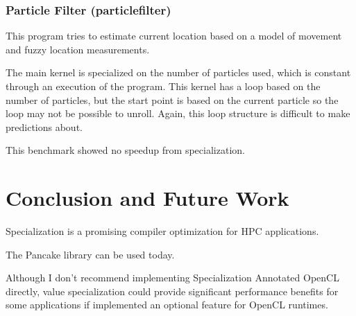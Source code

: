 \documentclass{acm_proc_article-sp}
\begin{document}
\subsubsection{Particle Filter (particlefilter)}

This program tries to estimate current location based on a model of movement
and fuzzy location measurements. 

The main kernel is specialized on the number of particles used, which is
constant through an execution of the program. This kernel has a loop based on
the number of particles, but the start point is based on the current particle
so the loop may not be possible to unroll. Again, this loop structure is
difficult to make predictions about.

This benchmark showed no speedup from specialization.

\section{Conclusion and Future Work}

Specialization is a promising compiler optimization for HPC applications.

The Pancake library can be used today.

Although I don't recommend implementing Specialization Annotated OpenCL
directly, value specialization could provide significant performance benefits
for some applications if implemented an optional feature for OpenCL runtimes.




\balancecolumns
\end{document}

